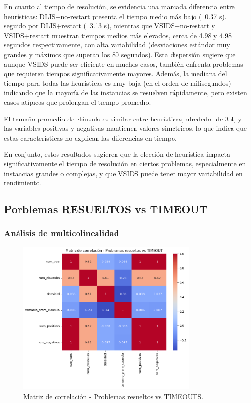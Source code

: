 En cuanto al tiempo de resolución, se evidencia una marcada diferencia entre heurísticas: DLIS+no-restart presenta el tiempo medio más bajo (~0.37 s), seguido por DLIS+restart (~3.13 s), mientras que VSIDS+no-restart y VSIDS+restart muestran tiempos medios más elevados, cerca de 4.98 y 4.98 segundos respectivamente, con alta variabilidad (desviaciones estándar muy grandes y máximos que superan los 80 segundos). Esta dispersión sugiere que aunque VSIDS puede ser eficiente en muchos casos, también enfrenta problemas que requieren tiempos significativamente mayores. Además, la mediana del tiempo para todas las heurísticas es muy baja (en el orden de milisegundos), indicando que la mayoría de las instancias se resuelven rápidamente, pero existen casos atípicos que prolongan el tiempo promedio.

El tamaño promedio de cláusula es similar entre heurísticas, alrededor de 3.4, y las variables positivas y negativas mantienen valores simétricos, lo que indica que estas características no explican las diferencias en tiempo.

En conjunto, estos resultados sugieren que la elección de heurística impacta significativamente el tiempo de resolución en ciertos problemas, especialmente en instancias grandes o complejas, y que VSIDS puede tener mayor variabilidad en rendimiento.

\subsection{Porblemas RESUELTOS vs TIMEOUT}

\subsubsection{An\'alisis de multicolinealidad}

\begin{figure}[ht]
    \centering
    \includegraphics[width=0.8\textwidth]{Graphics/correlation_matrix_solveds_vs_timeouts.png}
    \caption{Matriz de correlaci\'on - Problemas resueltos vs TIMEOUTS.}
    \label{fig:correlation-matrix-solved-vs-timeout}
\end{figure}

